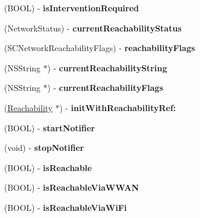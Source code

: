 \begin{DoxyCompactItemize}
(B\+O\+OL) -\/ {\bfseries is\+Intervention\+Required}
\item 
\mbox{\label{interface_reachability_a8396438436e7ff3770039fb527cd1d34}} 
(Network\+Status) -\/ {\bfseries current\+Reachability\+Status}
\item 
\mbox{\label{interface_reachability_ac9080e40006cd8c82431a668ec8bfe18}} 
(S\+C\+Network\+Reachability\+Flags) -\/ {\bfseries reachability\+Flags}
\item 
\mbox{\label{interface_reachability_af07f0954cd2c09505d5fdccb25941351}} 
(N\+S\+String $\ast$) -\/ {\bfseries current\+Reachability\+String}
\item 
\mbox{\label{interface_reachability_a3191086f18ebe51a0ed8d525c3175f38}} 
(N\+S\+String $\ast$) -\/ {\bfseries current\+Reachability\+Flags}
\item 
\mbox{\label{interface_reachability_af8dbb23cc7f9ac59b0269dfaf83979fc}} 
(\mbox{\hyperlink{interface_reachability}{Reachability}} $\ast$) -\/ {\bfseries init\+With\+Reachability\+Ref\+:}
\item 
\mbox{\label{interface_reachability_ae20732960a222681fcc7caeb191158bc}} 
(B\+O\+OL) -\/ {\bfseries start\+Notifier}
\item 
\mbox{\label{interface_reachability_ab7907e9c8de0e4e15774e82c089e0b39}} 
(void) -\/ {\bfseries stop\+Notifier}
\item 
\mbox{\label{interface_reachability_ae0b18fcacc97f538502cf671aa583dbd}} 
(B\+O\+OL) -\/ {\bfseries is\+Reachable}
\item 
\mbox{\label{interface_reachability_a20011128b407d36659bc78a64cd583f5}} 
(B\+O\+OL) -\/ {\bfseries is\+Reachable\+Via\+W\+W\+AN}
\item 
\mbox{\label{interface_reachability_a994f39db8e47480480ffd7ee81159ecb}} 
(B\+O\+OL) -\/ {\bfseries is\+Reachable\+Via\+Wi\+Fi}
\item 

\end{DoxyCompactItemize}
